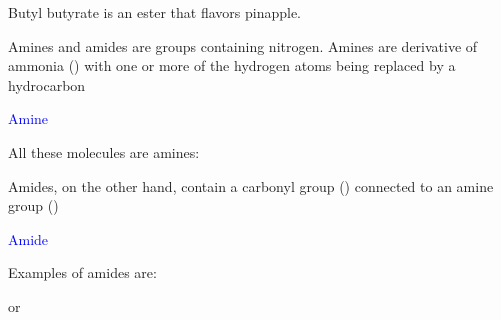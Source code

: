 \documentclass[main.tex]{subfiles}
\begin{document}
\begin{description}
\begin{marginfigure}[0cm]
\begin{center}\hspace{1cm}\end{center}
\caption{Butyl butyrate is an ester that flavors pinapple.}
\end{marginfigure}%

\item[\docfilehook{\smallpencil Amines and amides}{Amines and amides}] Amines and amides are groups containing nitrogen. Amines are derivative of ammonia () with one or more of the hydrogen atoms being replaced by a hydrocarbon
\begin{center}\hspace{0.5cm}\textcolor{blue}{Amine}\end{center}
 All these molecules are amines:
\begin{center}\hspace{1cm}   \hspace{1cm}   \end{center}
Amides, on the other hand, contain a carbonyl group () connected to an amine group ()
\begin{center}    \hspace{0.5cm}\textcolor{blue}{Amide}\end{center}
Examples of amides are:
\begin{center}\hspace{1cm} or \hspace{1cm}\end{center}


\end{description}
\end{document}
